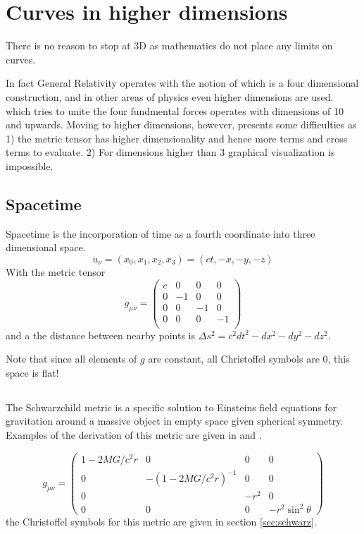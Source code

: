 \chapter{Curves in higher dimensions}
\label{sec:4dcurves}

There is no reason to stop at 3D as mathematics do not
place any limits on curves.

In fact General Relativity operates with the notion of  which 
is a four dimensional construction, and in other areas of physics
even higher dimensions are used.  which tries to 
unite the four fundmental forces operates with dimensions of 10 and
upwards. Moving to higher dimensions, however, presents some difficulties as 
1) the metric tensor has higher dimensionality and hence more terms and 
cross terms to evaluate. 2) For dimensions higher than 3 graphical visualization
is impossible.


\section{Spacetime}
Spacetime is the incorporation of time as a fourth coordinate into three dimensional space.
$$
    u_\nu = (x_0, x_1, x_2, x_3) = (ct, -x, -y, -z)
$$
With the metric tensor
$$
   g_{\mu\nu} = \begin{pmatrix}
       c &  0 &  0 &  0 \\ 
       0 & -1 &  0 &  0 \\ 
       0 &  0 & -1 &  0 \\ 
       0 &  0 &  0 & -1 \\ 
   \end{pmatrix} 
$$
and a the distance between nearby points is $\Delta s^2 = c^2dt^2 - dx^2 - dy^2 - dz^2$.

Note that since all elements of $g$ are constant, all Christoffel symbols are $0$, this space
is flat!


\section{}
The Schwarzchild metric is a specific solution to Einsteins field equations for gravitation
around a massive object in empty space given spherical symmetry. Examples of the derivation
of this metric are given in \cite{night} and \cite{padman}.

$$
   g_{\mu\nu} = \begin{pmatrix}
        1 - 2MG/c^2r & 0                  &   0  & 0     \\
        0            & -(1-2MG/c^2r)^{-1} &   0  & 0     \\
        0            &                    & -r^2 & 0     \\
        0            &         0          &   0  & -r^2\sin^2\theta 
      \end{pmatrix}
$$
the Christoffel symbols for this metric are given in section \ref{sec:schwarz}.


